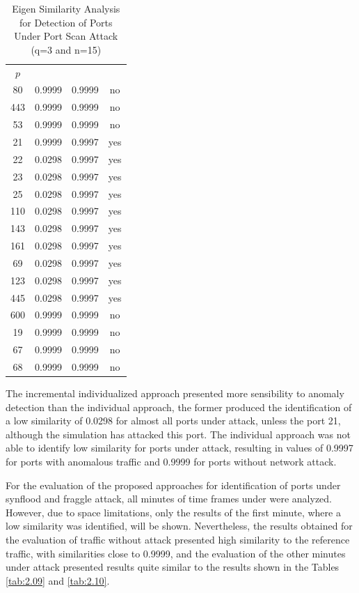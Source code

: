 \begin{table}[h!]
  \centering
  \caption{Eigen Similarity Analysis for Detection of Ports Under Port Scan Attack (q=3 and n=15)}
  \label{tab:2.08}
  \begin{tabular}{ c c c c }
	\toprule
	\multirow{2}{*}{\pmb{Port} $p$}   &\multicolumn{2}{c}{\pmb{Approaches}} &\multirow{2}{*}{\pmb{Ground Truth}}\\ 
			\hhline{~--~}
			&\pmb{Incremental Individualized} &\pmb{Individual}\\
	\midrule
	80 &0.9999 &0.9999 &no \\
	443 &0.9999 &0.9999 &no \\
	53 &0.9999 &0.9999 &no \\
	21 &0.9999 &0.9997 &yes \\
	22 &0.0298 &0.9997 &yes \\
	23 &0.0298 &0.9997 &yes \\
	25 &0.0298 &0.9997 &yes \\
	110 &0.0298 &0.9997 &yes \\
	143 &0.0298 &0.9997 &yes \\
	161 &0.0298 &0.9997 &yes \\
	69 &0.0298 &0.9997 &yes \\
	123 &0.0298 &0.9997 &yes \\
	445 &0.0298 &0.9997 &yes \\
	600 &0.9999 &0.9999 &no \\
	19 &0.9999 &0.9999 &no \\
	67 &0.9999 &0.9999 &no \\
	68 &0.9999 &0.9999 &no \\
    \bottomrule
  \end{tabular}
\end{table}

The incremental individualized approach presented more sensibility to anomaly detection than the individual approach, the former produced the identification of a low similarity of 0.0298 for almost all ports under attack, unless the port 21, although the simulation has attacked this port. The individual approach was not able to identify low similarity for ports under attack, resulting in values of 0.9997 for ports with anomalous traffic and 0.9999 for ports without network attack.

For the evaluation of the proposed approaches for identification of ports under synflood and fraggle attack, all minutes of time frames under were analyzed. However, due to space limitations, only the results of the first minute, where a low similarity was identified, will be shown. Nevertheless, the results obtained for the evaluation of traffic without attack presented high similarity to the reference traffic, with similarities close to 0.9999, and the evaluation of the other minutes under attack presented results quite similar to the results shown in the Tables \ref{tab:2.09} and \ref{tab:2.10}.

